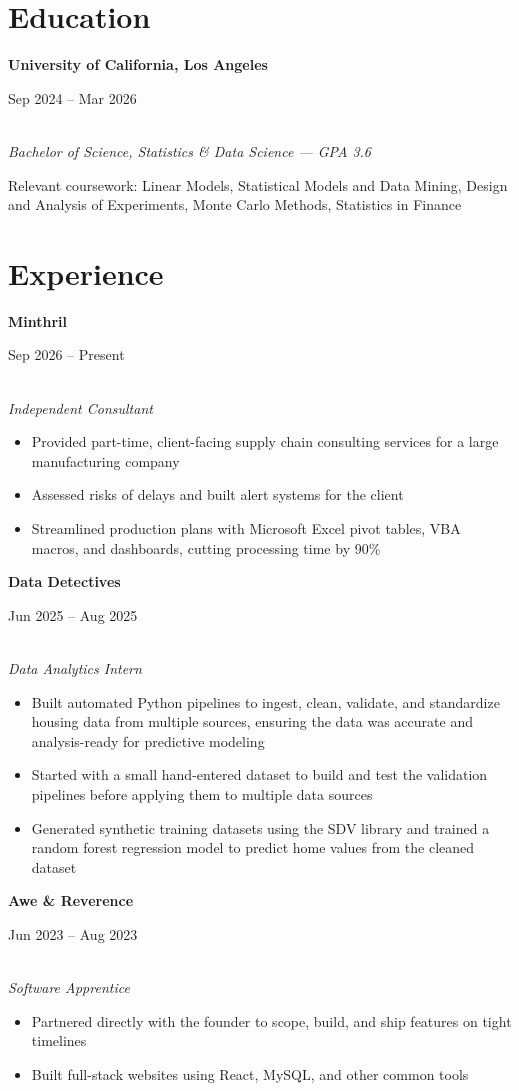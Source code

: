 \documentclass[11pt,letterpaper]{article}
\newcommand{\entry}[3]{%
  \noindent\begin{minipage}[t]{0.72\textwidth}\raggedright\textbf{#1}\end{minipage}%
  \hfill\begin{minipage}[t]{0.26\textwidth}\raggedleft\small\color{gray}#2\end{minipage}\\
  \textit{#3}\par\vspace{2pt}
}
\begin{document}


\vspace{4pt}

\section*{Education}
\entry{University of California, Los Angeles}{Sep 2024 -- Mar 2026}{Bachelor of Science, Statistics \& Data Science --- GPA 3.6}
\small Relevant coursework: Linear Models, Statistical Models and Data Mining, Design and Analysis of Experiments, Monte Carlo Methods, Statistics in Finance

\section*{Experience}

\entry{Minthril}{Sep 2026 -- Present}{Independent Consultant}
\begin{itemize}
  \item Provided part-time, client-facing supply chain consulting services for a large manufacturing company
  \item Assessed risks of delays and built alert systems for the client
  \item Streamlined production plans with Microsoft Excel pivot tables, VBA macros, and dashboards, cutting processing time by 90\%
\end{itemize}

\entry{Data Detectives}{Jun 2025 -- Aug 2025}{Data Analytics Intern}
\begin{itemize}
  \item Built automated Python pipelines to ingest, clean, validate, and standardize housing data from multiple sources, ensuring the data was accurate and analysis-ready for predictive modeling
  \item Started with a small hand-entered dataset to build and test the validation pipelines before applying them to multiple data sources
  \item Generated synthetic training datasets using the SDV library and trained a random forest regression model to predict home values from the cleaned dataset
\end{itemize}

\entry{Awe \& Reverence}{Jun 2023 -- Aug 2023}{Software Apprentice}
\begin{itemize}
  \item Partnered directly with the founder to scope, build, and ship features on tight timelines
  \item Built full-stack websites using React, MySQL, and other common tools
\end{itemize}
\end{document}
